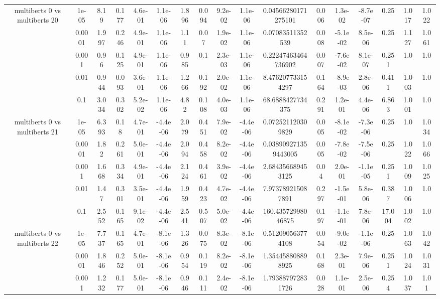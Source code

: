 \begin{tabular}{|c|c|c|c|c|c|c|c|c|c|c|c|c|c|c|c|c|}
\hline
\multirow{5}{*}{multiberts 0 vs multiberts 20} & 1e-05 & 8.19 & 0.177 & 4.6e-01 & 1.1e-06 & 1.896 & 0.094 & 9.2e-02 & 1.1e-06 & 0.04566280171275101 & 0.006 & 1.3e-02 & -8.7e-07 & 0.25 & 1.017 & 1.022 \\
 & 0.0001 & 1.997 & 0.246 & 4.9e-01 & 1.1e-06 & 1.11 & 0.07 & 1.9e-02 & 1.1e-06 & 0.07083511352539 & 0.008 & -5.1e-02 & 8.5e-06 & 0.25 & 1.127 & 1.061 \\
 & 0.001 & 0.96 & 0.125 & 4.9e-01 & 1.1e-06 & 0.985 & 0.1 & 2.3e-03 & 1.1e-06 & 0.22247463464736902 & 0.007 & -7.6e-02 & 8.1e-07 & 0.251 & 1.0 & 1.0 \\
 & 0.01 & 0.944 & 0.093 & 3.6e-01 & 1.1e-06 & 1.266 & 0.192 & 2.0e-02 & 1.1e-06 & 8.476207733154297 & 0.164 & -8.9e-03 & 2.8e-06 & 0.411 & 1.003 & 1.0 \\
 & 0.1 & 3.034 & 0.302 & 5.2e-02 & 1.1e-06 & 4.82 & 0.108 & 4.0e-03 & 1.1e-06 & 68.6888427734375 & 0.291 & 1.2e-01 & 4.4e-06 & 6.863 & 1.001 & 1.0 \\
\hline
\multirow{5}{*}{multiberts 0 vs multiberts 21} & 1e-05 & 6.393 & 0.18 & 4.7e-01 & -4.4e-06 & 2.079 & 0.451 & 7.9e-02 & -4.4e-06 & 0.072521120309829 & 0.005 & -8.1e-02 & -7.3e-06 & 0.25 & 1.0 & 1.034 \\
 & 0.0001 & 1.82 & 0.261 & 5.0e-01 & -4.4e-06 & 2.094 & 0.458 & 8.2e-02 & -4.4e-06 & 0.038909271359443005 & 0.005 & -7.8e-02 & -7.5e-06 & 0.25 & 1.022 & 1.066 \\
 & 0.001 & 1.668 & 0.334 & 4.9e-01 & -4.4e-06 & 2.124 & 0.461 & 3.9e-02 & -4.4e-06 & 2.684356689453125 & 0.04 & 2.0e-01 & -1.1e-05 & 0.251 & 1.009 & 1.025 \\
 & 0.01 & 1.47 & 0.301 & 3.5e-01 & -4.4e-06 & 1.959 & 0.423 & 4.7e-02 & -4.4e-06 & 7.973789215087891 & 0.297 & -1.5e-01 & 5.8e-06 & 0.387 & 1.006 & 1.0 \\
 & 0.1 & 2.552 & 0.165 & 9.1e-02 & -4.4e-06 & 2.541 & 0.507 & 5.0e-02 & -4.4e-06 & 160.43572998046875 & 0.197 & -1.1e-01 & 7.8e-06 & 17.004 & 1.002 & 1.0 \\
\hline
\multirow{5}{*}{multiberts 0 vs multiberts 22} & 1e-05 & 7.737 & 0.165 & 4.7e-01 & -8.1e-06 & 1.326 & 0.075 & 8.3e-02 & -8.1e-06 & 0.512090563774108 & 0.054 & -9.0e-02 & -1.1e-06 & 0.25 & 1.063 & 1.042 \\
 & 0.0001 & 1.846 & 0.252 & 5.0e-01 & -8.1e-06 & 0.954 & 0.119 & 8.2e-02 & -8.1e-06 & 1.354458808898925 & 0.168 & 2.3e-01 & 7.9e-06 & 0.251 & 1.024 & 1.031 \\
 & 0.001 & 1.232 & 0.177 & 5.0e-01 & -8.1e-06 & 0.946 & 0.111 & 2.4e-02 & -8.1e-06 & 1.793887972831726 & 0.028 & 1.1e-01 & 2.5e-06 & 0.254 & 1.037 & 1.01 \\

\end{tabular}

